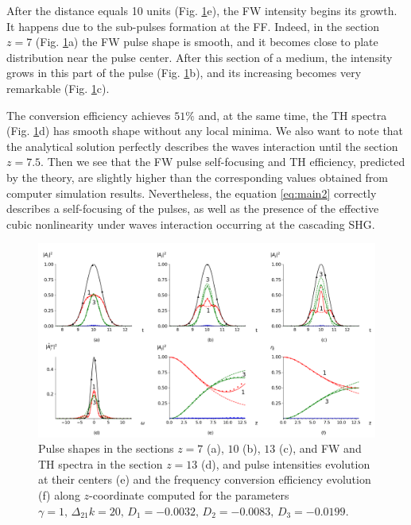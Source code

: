 \documentclass[a4paper, 12pt, onecolumn]{extarticle}
\begin{document}
After the distance equals 10 units (Fig. \ref{fr:c1_1}e), the FW intensity begins its growth. It happens due to the sub-pulses formation at the FF. Indeed, in the section \(z=7\) (Fig. \ref{fr:c1_1}a) the FW pulse shape is smooth, and it becomes close to plate distribution near the pulse center. After this section of a medium, the intensity grows in this part of the pulse (Fig. \ref{fr:c1_1}b), and its increasing becomes very remarkable (Fig. \ref{fr:c1_1}c). 

The conversion efficiency achieves \(51\%\) and, at the same time, the TH spectra (Fig. \ref{fr:c1_1}d)  has smooth shape without any local minima. We also want to note that the analytical solution perfectly describes the waves interaction until the section \(z=7.5\). Then we see that the FW pulse self-focusing and TH efficiency, predicted by the theory, are slightly higher than the corresponding values obtained from computer simulation results. Nevertheless, the equation \eqref{eq:main2} correctly describes a self-focusing of the pulses, as well as the presence of the effective cubic nonlinearity under waves interaction occurring at the cascading SHG.
\begin{figure}[h!] 
\centering 
\includegraphics[width=\linewidth]{Cascade1_1}  
\caption{Pulse shapes in the sections \(z=7\) (a), \(10\) (b), \(13\) (c), and FW and TH spectra in the section \(z=13\) (d), and pulse intensities evolution at their centers (e) and the frequency conversion efficiency evolution (f) along \(z\)-coordinate computed for the parameters $\gamma=1,\, \Delta_{21} k=20,\, D_1=-0.0032,\, D_2=-0.0083,\, D_3=-0.0199.$ } 
\label{fr:c1_1}
\end{figure}
\end{document}
